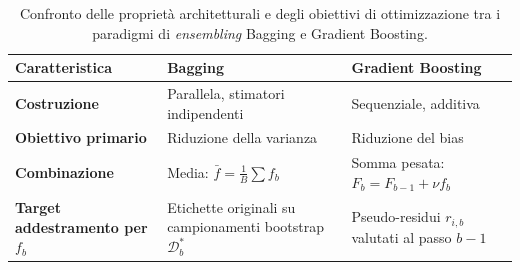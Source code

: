 \begin{table}[H]
    \centering
    \small
    \caption{Confronto delle proprietà architetturali e degli obiettivi di ottimizzazione tra i paradigmi di \textit{ensembling} Bagging e Gradient Boosting.}
    \label{tab:bagging_vs_boosting}
    \begin{tabularx}{\textwidth}{l >{\raggedright\arraybackslash}X >{\raggedright\arraybackslash}X }
        \toprule
        \textbf{Caratteristica} & \textbf{Bagging} & \textbf{Gradient Boosting} \\
        \midrule
        \textbf{Costruzione} & Parallela, stimatori indipendenti & Sequenziale, additiva \\
        \textbf{Obiettivo primario} & Riduzione della varianza & Riduzione del bias \\
        \textbf{Combinazione} & Media: $\bar{f} = \frac{1}{B}\sum f_b$ & Somma pesata: $F_b = F_{b-1} + \nu f_b$ \\
        \textbf{Target addestramento per $f_b$} & Etichette originali su campionamenti bootstrap $\mathcal{D}_b^*$ & Pseudo-residui $r_{i,b}$ valutati al passo $b-1$ \\
        \bottomrule
    \end{tabularx}
\end{table}

